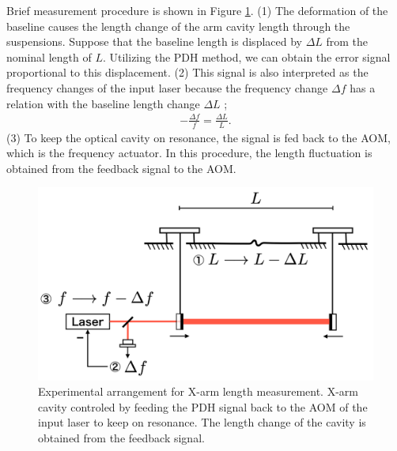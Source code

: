 Brief measurement procedure is shown in Figure \ref{img:img600}. (1) The deformation of the baseline causes the length change of the arm cavity length through the suspensions. Suppose that the baseline length is displaced by $\Delta{L}$ from the nominal length
of $L$. Utilizing the PDH method, we can obtain the error signal proportional to this displacement. (2) This signal is also interpreted as the frequency changes of the input laser because the frequency change $\Delta{f}$ has a relation with the baseline length change $\Delta{L}$ \cite{izumi2012multi};
\begin{eqnarray}
  \displaystyle -\frac{\Delta{f}}{f} = \frac{\Delta{L}}{L}.
\end{eqnarray}
(3) To keep the optical cavity on resonance, the signal is fed back to the AOM, which is the frequency actuator. In this procedure, the length fluctuation is obtained from the feedback signal to the AOM.
\begin{figure}[h]
  \centering
  \includegraphics[width=13cm]{./img_chap6/img600.png}
  \caption{Experimental arrangement for X-arm length measurement. X-arm cavity controled by feeding the PDH signal back to the AOM of the input laser to keep on resonance. The length change of the cavity is obtained from the feedback signal.}
  \label{img:img600}  
\end{figure}



